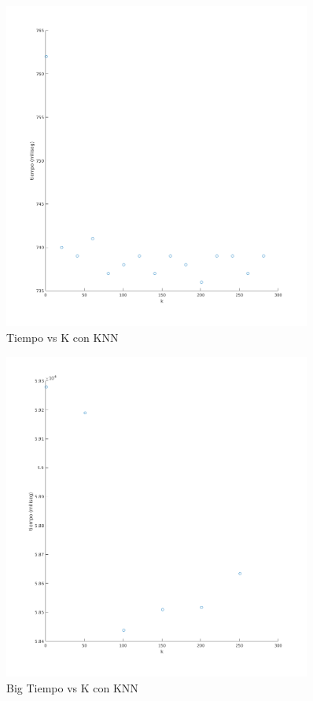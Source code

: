 \begin{figure}[H]
	\centering	\includegraphics[width=0.9\textwidth]{img/k_knn_tiempo.png}
	\caption{Tiempo vs K con KNN}
	\label{fig:K vs Tiempo con KNN}
\end{figure}
\begin{figure}[H]
	\centering	\includegraphics[width=0.9\textwidth]{img/big_k_knn_tiempo.png}
	\caption{Big Tiempo vs K con KNN}
	\label{fig:Big K vs Tiempo con KNN}
\end{figure}





